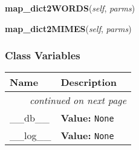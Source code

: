 \hspace{.8\funcindent}\begin{boxedminipage}{\funcwidth}

    \raggedright \textbf{map\_dict2WORDS}(\textit{self}, \textit{parms})

\setlength{\parskip}{2ex}
\setlength{\parskip}{1ex}
    \end{boxedminipage}

    \label{db_mapper:db_handler:map_dict2MIMES}

    \vspace{0.5ex}

\hspace{.8\funcindent}\begin{boxedminipage}{\funcwidth}

    \raggedright \textbf{map\_dict2MIMES}(\textit{self}, \textit{parms})

\setlength{\parskip}{2ex}
\setlength{\parskip}{1ex}
    \end{boxedminipage}



  \subsubsection{Class Variables}

    \vspace{-1cm}
\hspace{\varindent}\begin{longtable}{|p{\varnamewidth}|p{\vardescrwidth}|l}
\cline{1-2}
\cline{1-2} \centering \textbf{Name} & \centering \textbf{Description}& \\
\cline{1-2}
\endhead\cline{1-2}\multicolumn{3}{r}{\small\textit{continued on next page}}\\\endfoot\cline{1-2}
\endlastfoot\raggedright \_\-\_\-d\-b\-\_\-\_\- & \raggedright \textbf{Value:} 
{\tt None}&\\
\cline{1-2}
\raggedright \_\-\_\-l\-o\-g\-\_\-\_\- & \raggedright \textbf{Value:} 
{\tt None}&\\
\cline{1-2}
\end{longtable}

